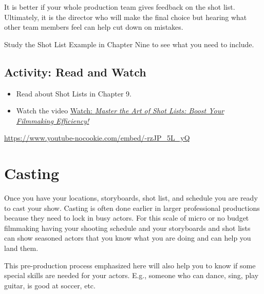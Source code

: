 \documentclass[
  letterpaper,
  DIV=11,
  numbers=noendperiod]{scrreprt}
\providecommand{\tightlist}{%
  \setlength{\itemsep}{0pt}\setlength{\parskip}{0pt}}\usepackage{longtable,booktabs,array}
\begin{document}
It is better if your whole production team gives feedback on the shot
list. Ultimately, it is the director who will make the final choice but
hearing what other team members feel can help cut down on mistakes.

Study the Shot List Example in Chapter Nine to see what you need to
include.

\subsection{Activity: Read and Watch}\label{activity-read-and-watch-2}

\begin{tcolorbox}[enhanced jigsaw, opacityback=0, colframe=quarto-callout-note-color-frame, leftrule=.75mm, arc=.35mm, rightrule=.15mm, colbacktitle=quarto-callout-note-color!10!white, titlerule=0mm, colback=white, toprule=.15mm, bottomtitle=1mm, breakable, toptitle=1mm, title={Learning Activity}, coltitle=black, bottomrule=.15mm, left=2mm, opacitybacktitle=0.6]

\begin{itemize}
\tightlist
\item
  Read about Shot Lists in Chapter 9.
\item
  Watch the video
  \href{https://www.youtube.com/watch?v=-rzJP_5L_yQ}{Watch: \emph{Master
  the Art of Shot Lists: Boost Your Filmmaking Efficiency!}}
\end{itemize}

\url{https://www.youtube-nocookie.com/embed/-rzJP_5L_yQ}

\end{tcolorbox}

\section{Casting}\label{casting}

Once you have your locations, storyboards, shot list, and schedule you
are ready to cast your show. Casting is often done earlier in larger
professional productions because they need to lock in busy actors. For
this scale of micro or no budget filmmaking having your shooting
schedule and your storyboards and shot lists can show seasoned actors
that you know what you are doing and can help you land them.

This pre-production process emphasized here will also help you to know
if some special skills are needed for your actors. E.g., someone who can
dance, sing, play guitar, is good at soccer, etc.
\end{document}
